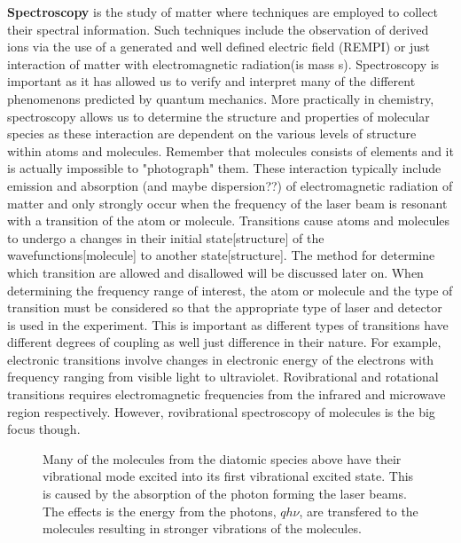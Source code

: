 \documentclass[11pt,a4paper]{book}
\newcommand{\imginput}[1]{} %
\begin{document}
		{\bfseries Spectroscopy} is the study of matter where techniques are employed to collect their spectral information. Such techniques include the observation of derived ions via the use of a generated and well defined electric field (REMPI) or just interaction of matter with electromagnetic radiation(is mass s). Spectroscopy is important as it has allowed us to verify and interpret many of the different phenomenons predicted by quantum mechanics. More practically in chemistry, spectroscopy allows us to determine the structure and properties of molecular species as these interaction are dependent on the various levels of structure within atoms and molecules. Remember that molecules consists of elements and it is actually impossible to "photograph" them. These interaction typically include emission and absorption (and maybe dispersion??) of electromagnetic radiation of matter and only strongly occur when the frequency of the laser beam is resonant with a transition of the atom or molecule. Transitions cause atoms and molecules to undergo a changes in their initial state[structure] of the wavefunctions[molecule] to another state[structure]. The method for determine which transition are allowed and disallowed will be discussed later on. When determining the frequency range of interest, the atom or molecule and the type of transition must be considered so that the appropriate type of laser and detector is used in the experiment. This is important as different types of transitions have different degrees of coupling as well just difference in their nature. For example, electronic transitions involve changes in electronic energy of the electrons with frequency ranging from visible light to ultraviolet. Rovibrational and rotational transitions requires electromagnetic frequencies from the infrared and microwave region respectively. However, rovibrational spectroscopy of molecules is the big focus though. 
	
		\begin{figure} [!ht]
			\centering
			\def\svgwidth{\columnwidth}
			\resizebox{15cm}{!}{\imginput{images/abs-rovib-trans.pdf_tex}}
			\caption{Many of the molecules from the  diatomic species above have their vibrational mode  excited into its first vibrational excited state. This is caused by the absorption of the photon forming the laser beams. The effects is the energy from the photons, $qh\nu$, are transfered to the molecules resulting in stronger vibrations of the molecules.}
			\label{fig:abs-rovib-trans}
		\end{figure}	
		
\end{document}
